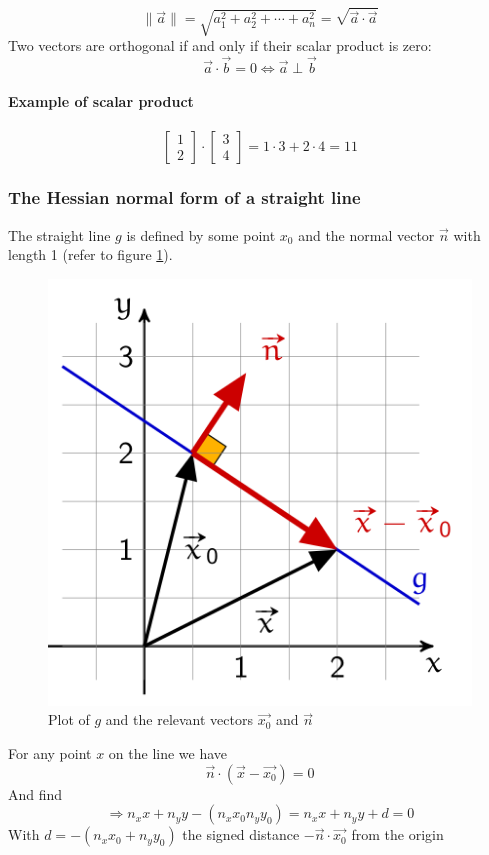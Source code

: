 \documentclass[11pt]{article}
\begin{document}
\begin{equation}
    \| \vec{a} \| = \sqrt{a_1^2 + a_2^2 + \cdots + a_n^2} = \sqrt{\vec{a}\cdot\vec{a}}
\end{equation}
\noindent
Two vectors are orthogonal if and only if their scalar product is zero:
\begin{equation}
    \vec{a}\cdot\vec{b} = 0 \Leftrightarrow \vec{a} \perp \vec{b}
\end{equation}

\paragraph{Example of scalar product}
\begin{equation*}
    \begin{bmatrix}1\\2\end{bmatrix}\cdot\begin{bmatrix}3\\4\end{bmatrix} = 1\cdot 3 + 2\cdot 4 = 11
\end{equation*}

\subsubsection{The Hessian normal form of a straight line}

The straight line $g$ is defined by some point $x_0$ and the normal vector $\vec{n}$ with length 1 (refer to figure \ref{fig:hessiannormalform}).

\begin{figure}[htb!]
    \centering
    \includegraphics[keepaspectratio, width=0.4\linewidth]{Pictures/Hessian_normal_form}
    \caption{Plot of $g$ and the relevant vectors $\vec{x_0}$ and $\vec{n}$}
    \label{fig:hessiannormalform}
\end{figure}
\noindent
For any point $x$ on the line we have
\begin{equation*}
    \vec{n}\cdot(\vec{x}-\vec{x_0})=0
\end{equation*}
\noindent
And find
\begin{equation*}
    \Rightarrow n_x x + n_y y -(n_x x_0  n_y y_0) = n_x x +n_y y + d = 0
\end{equation*}
\noindent
With $d=-(n_x x_0 +n_y y_0)$ the signed distance $-\vec{n}\cdot\vec{x_0}$ from the origin
\end{document}
